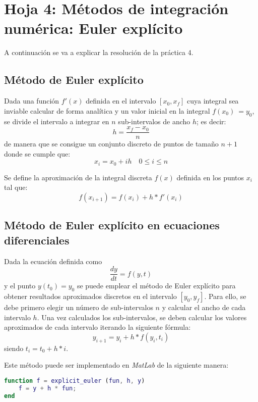 \section{Hoja 4: Métodos de integración numérica: Euler explícito}
\label{sec:metodos-de-1-paso:-euler}

A continuación se va a explicar la resolución de la práctica 4.

\subsection{Método de Euler explícito}\label{subsec:metodo-de-euler-explicito}

Dada una función \(f'(x)\) definida en el intervalo \([x_0, x_f]\) cuya
integral sea inviable calcular de forma analítica y un valor inicial en la integral
\(f(x_0)\ = y_0\), se divide el intervalo a integrar en \(n\) sub-intervalos
de ancho \(h\); es decir: \[h = \frac{x_f - x_0}{n}\]
de manera que se consigue un conjunto discreto de puntos de tamaño \(n+1\)
donde se cumple que: \[x_i = x_0 + ih \quad 0 \leq i \leq n\]

Se define la aproximación de la integral discreta \(f(x)\) definida en
los puntos \(x_i\) tal que: \[f(x_{i+1}) = f(x_i) + h * f'(x_i)\]

\subsection{Método de Euler explícito en ecuaciones diferenciales}
\label{subsec:metodo-de-euler-explicito-en-ecuaciones-diferenciales}

Dada la ecuación definida como \[\frac{dy}{dt} = f(y, t)\] y el punto \(y(t_0) = y_0\)
se puede emplear el método de Euler explícito para obtener resultados aproximados
discretos en el intervalo \([y_0, y_f]\).
Para ello, se debe primero elegir un número de sub-intervalos \(n\) y calcular
el ancho de cada intervalo \(h\).
Una vez calculados los sub-intervalos, se deben calcular los valores aproximados
de cada intervalo iterando la siguiente fórmula:
\[y_{i+1} = y_i + h * f(y_i, t_i)\]
siendo \(t_i = t_0 + h * i\).

Este método puede ser implementado en \textit{MatLab} de la siguiente manera:

\begin{lstlisting}[language=Matlab, caption={Método de Euler explícito.},captionpos=b,
    texcl=true,label={lst:lstlisting}]
function f = explicit_euler (fun, h, y)
    f = y + h * fun;
end
\end{lstlisting}

